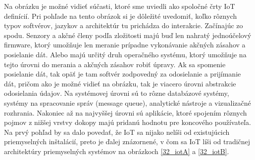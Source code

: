 Na obrázku je možné vidieť súčasti, ktoré sme uviedli ako spoločné črty IoT definícií. Pri pohľade na tento obrázok si je dôležité uvedomiť, koľko rôznych typov softvérov, jazykov a architektúr tu prichádza do interakcie. Začínajúc zo spodu. Senzory a akčné členy podľa zložitosti majú buď len nahratý jednoúčelový firmware, ktorý umožňuje len meranie prípadne vykonávanie akčných zásahov a posielanie dát. Alebo majú určitý druh operačného systému, ktorý umožňuje na tejto úrovni do merania a akčných zásahov robiť úpravy. Ak sa spomenie posielanie dát, tak opäť je tam softvér zodpovedný za odosielanie a prijímanie dát, pričom ako je možné vidieť na obrázku, tak je viacero úrovni abstrakcie odosielania údajov. Na systémovej úrovni sú to rôzne databázové systémy, systémy na spracovanie správ (message queue), analytické nástroje a vizualizačné rozhrania. Nakoniec až na najvyššej úrovni sú aplikácie, ktoré spojením rôznych pojmov z nižšej vrstvy dokopy majú pridanú hodnotu pre koncového používateľa. Na prvý pohľad by sa dalo povedať, že IoT sa nijako nelíši od existujúcich priemyselných inštalácií, preto je ďalej znázornené, v čom sa IoT líši od tradičnej architektúry priemyselných systémov na obrázkoch \ref{32_iotA} a \ref{32_iotB}.

